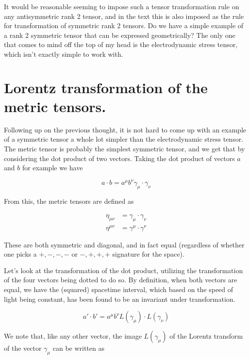 It would be reasonable seeming to impose such a tensor transformation rule on any antisymmetric rank 2 tensor, and in the text this is also imposed as the rule for transformation of symmetric rank 2 tensors.  Do we have a simple example of a rank 2 symmetric tensor that can be expressed geometrically?  The only one that comes to mind off the top of my head is the electrodynamic stress tensor, which isn't exactly simple to work with.

\section{Lorentz transformation of the metric tensors.}

Following up on the previous thought, it is not hard to come up with an example of a symmetric tensor a whole lot simpler than the electrodynamic stress tensor.  The metric tensor is probably the simplest symmetric tensor, and we get that by considering the dot product of two vectors.  Taking the dot product of vectors $a$ and $b$ for example we have

\begin{equation}\label{eqn:antisymmetricTensorTx:300}
a \cdot b 
= a^\mu b^\nu \gamma_\mu \cdot \gamma_\nu
\end{equation}

From this, the metric tensors are defined as

\begin{align}\label{eqn:antisymmetricTensorTx:310}
\eta_{\mu\nu} &= \gamma_\mu \cdot \gamma_\nu \\
\eta^{\mu\nu} &= \gamma^\mu \cdot \gamma^\nu
\end{align}

These are both symmetric and diagonal, and in fact equal (regardless of whether one picks a $+,-,-,-$ or $-,+,+,+$ signature for the space).

Let's look at the transformation of the dot product, utilizing the transformation of the four vectors being dotted to do so.  By definition, when both vectors are equal, we have the (squared) spacetime interval, which based on the speed of light being constant, has been found to be an invariant under transformation.

\begin{equation}\label{eqn:antisymmetricTensorTx:320}
a' \cdot b'
= 
a^\mu b^\nu L(\gamma_\mu) \cdot L(\gamma_\nu)
\end{equation}

We note that, like any other vector, the image $L(\gamma_\mu)$ of the Lorentz transform of the vector $\gamma_\mu$ can be written as

